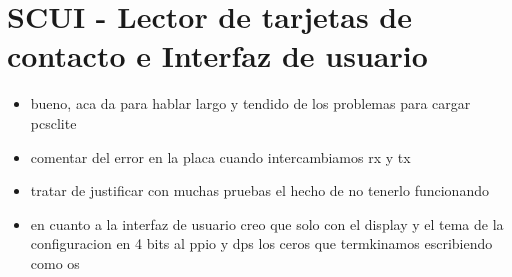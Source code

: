 \section{SCUI - Lector de tarjetas de contacto e Interfaz de usuario}
\begin{itemize}
\item bueno, aca da para hablar largo y tendido de los problemas para cargar pcsclite
\item comentar del error en la placa cuando intercambiamos rx y tx
\item tratar de justificar con muchas pruebas el hecho de no tenerlo funcionando
\item en cuanto a la interfaz de usuario creo que solo con el display y el tema de la configuracion en 4 bits al ppio y dps los ceros que termkinamos escribiendo como os
\end{itemize}

